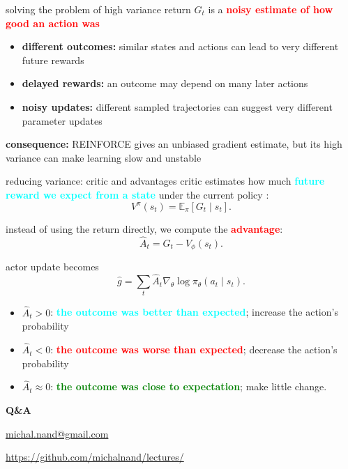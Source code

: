 \documentclass[xcolor=dvipsnames]{beamer}
\begin{document}
\begin{frame}{solving the problem of high variance}
    return $G_t$ is a \textbf{\textcolor{red}{noisy estimate of how good an action was}}

    \vspace{0.2cm}
    \begin{itemize}
        \item \textbf{different outcomes:}
              similar states and actions can lead to very different
              future rewards
        \item \textbf{delayed rewards:}
              an outcome may depend on many later actions
        \item \textbf{noisy updates:}
              different sampled trajectories can suggest very different
              parameter updates
    \end{itemize}

    
    \vspace{0.2cm}
    \textbf{consequence:} REINFORCE gives an unbiased gradient estimate,
    but its high variance can make learning slow and unstable
\end{frame}


\begin{frame}{reducing variance: critic and advantages}
    critic estimates how much \textbf{\textcolor{cyan}{future reward we expect from a state}}
    under the current policy :
    \[
        V^\pi(s_t)
        =
        \mathbb{E}_\pi[G_t \mid s_t].
    \]


    instead of using the return directly, we compute the \textbf{\textcolor{red}{advantage}}:
    \[
        \hat{A}_t = G_t - V_\phi(s_t).
    \]

    \vspace{-0.1cm}
    actor update becomes
    \[
        \hat{g}
        =
        \sum_t
        \hat{A}_t
        \nabla_\theta
        \log \pi_\theta(a_t \mid s_t).
    \]


    \begin{itemize}
        \item $\hat{A}_t > 0$: \textbf{\textcolor{cyan}{the outcome was better than expected}};
              increase the action's probability
        \item $\hat{A}_t < 0$: \textbf{\textcolor{red}{the outcome was worse than expected}};
              decrease the action's probability
        \item $\hat{A}_t \approx 0$: \textbf{\textcolor{green}{the outcome was close to expectation}};
              make little change.
    \end{itemize}

    
\end{frame}




\begin{frame}{\bf Q\&A}


\url{michal.nand@gmail.com}

\url{https://github.com/michalnand/lectures/}

 
\end{frame}
\end{document}
